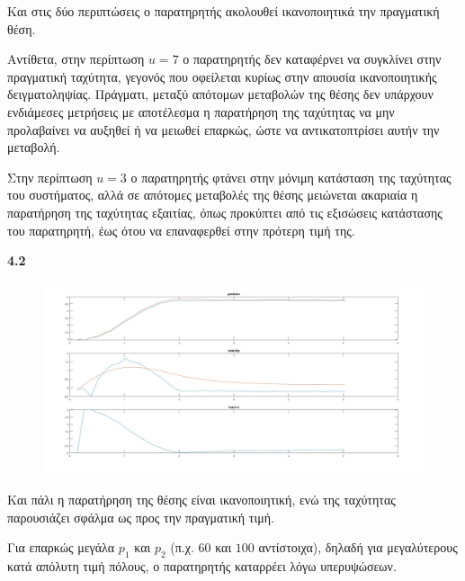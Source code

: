 \documentclass[12pt]{article}
\begin{document}
Και στις δύο περιπτώσεις ο παρατηρητής ακολουθεί ικανοποιητικά την πραγματική θέση. 

Αντίθετα, στην περίπτωση \(u = 7\) ο παρατηρητής δεν καταφέρνει να συγκλίνει στην πραγματική ταχύτητα, γεγονός που οφείλεται κυρίως στην απουσία ικανοποιητικής δειγματοληψίας. Πράγματι, μεταξύ απότομων μεταβολών της θέσης δεν υπάρχουν ενδιάμεσες μετρήσεις με αποτέλεσμα η παρατήρηση της ταχύτητας να μην προλαβαίνει να αυξηθεί ή να μειωθεί επαρκώς, ώστε να αντικατοπτρίσει αυτήν την μεταβολή. 

Στην περίπτωση \(u = 3\) ο παρατηρητής φτάνει στην μόνιμη κατάσταση της ταχύτητας του συστήματος, αλλά σε απότομες μεταβολές της θέσης μειώνεται ακαριαία η παρατήρηση της ταχύτητας εξαιτίας, όπως προκύπτει από τις εξισώσεις κατάστασης του παρατηρητή, έως ότου να επαναφερθεί στην πρότερη τιμή της.

\bigskip
\textbf{4.2}
\begin{figure}[H]
    \centering
    \includegraphics*[scale=0.25]{lab4b_all.jpg}
\end{figure}
Και πάλι η παρατήρηση της θέσης είναι ικανοποιητική, ενώ της ταχύτητας παρουσιάζει σφάλμα ως προς την πραγματική τιμή. 

Για επαρκώς μεγάλα \(p_1 \) και \(p_2\) (π.χ. \(60\) και \(100\) αντίστοιχα), δηλαδή για μεγαλύτερους κατά απόλυτη τιμή πόλους, ο παρατηρητής καταρρέει λόγω υπερυψώσεων. 
\end{document}
